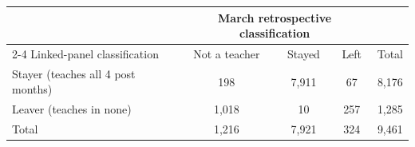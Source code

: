 \begin{tabular}{lcccc}
\toprule
 & \multicolumn{3}{c}{March retrospective classification} & \\
\cmidrule(lr){2-4}
Linked-panel classification & Not a teacher & Stayed & Left & Total \\
\midrule
Stayer (teaches all 4 post months) & 198 & 7,911 & 67 & 8,176 \\
Leaver (teaches in none) & 1,018 & 10 & 257 & 1,285 \\
\midrule
Total & 1,216 & 7,921 & 324 & 9,461 \\
\bottomrule
\end{tabular}
